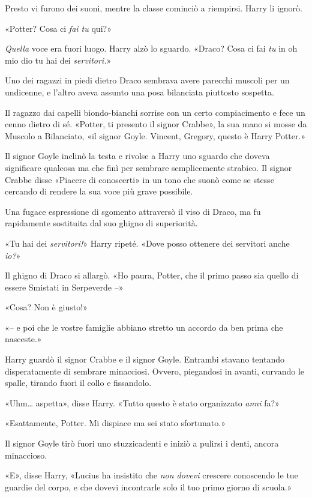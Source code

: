 Presto vi furono dei suoni, mentre la classe cominciò a riempirsi. Harry li ignorò.

«Potter? Cosa ci \textit{fai tu} qui?»

\textit{Quella} voce era fuori luogo. Harry alzò lo sguardo. «Draco? Cosa ci fai \textit{tu} in oh mio dio tu hai dei \textit{servitori.}»

Uno dei ragazzi in piedi dietro Draco sembrava avere parecchi muscoli per un undicenne, e l’altro aveva assunto una posa bilanciata piuttosto sospetta.

Il ragazzo dai capelli biondo-bianchi sorrise con un certo compiacimento e fece un cenno dietro di sé. «Potter, ti presento il signor Crabbe», la sua mano si mosse da Muscolo a Bilanciato, «il signor Goyle. Vincent, Gregory, questo è Harry Potter.»

Il signor Goyle inclinò la testa e rivolse a Harry uno sguardo che doveva significare qualcosa ma che finì per sembrare semplicemente strabico. Il signor Crabbe disse «Piacere di conoscerti» in un tono che suonò come se stesse cercando di rendere la sua voce più grave possibile.

Una fugace espressione di sgomento attraversò il viso di Draco, ma fu rapidamente sostituita dal suo ghigno di superiorità.

«Tu hai dei \textit{servitori!}» Harry ripeté. «Dove posso ottenere dei servitori anche \textit{io?}»

Il ghigno di Draco si allargò. «Ho paura, Potter, che il primo passo sia quello di essere Smistati in Serpeverde –»

«Cosa? Non è giusto!»

«– e poi che le vostre famiglie abbiano stretto un accordo da ben prima che nasceste.»

Harry guardò il signor Crabbe e il signor Goyle. Entrambi stavano tentando disperatamente di sembrare minacciosi. Ovvero, piegandosi in avanti, curvando le spalle, tirando fuori il collo e fissandolo.

«Uhm… aspetta», disse Harry. «Tutto questo è stato organizzato \textit{anni} fa?»

«Esattamente, Potter. Mi dispiace ma sei stato sfortunato.»

Il signor Goyle tirò fuori uno stuzzicadenti e iniziò a pulirsi i denti, ancora minaccioso.

«E», disse Harry, «Lucius ha insistito che \textit{non dovevi} crescere conoscendo le tue guardie del corpo, e che dovevi incontrarle solo il tuo primo giorno di scuola.»

